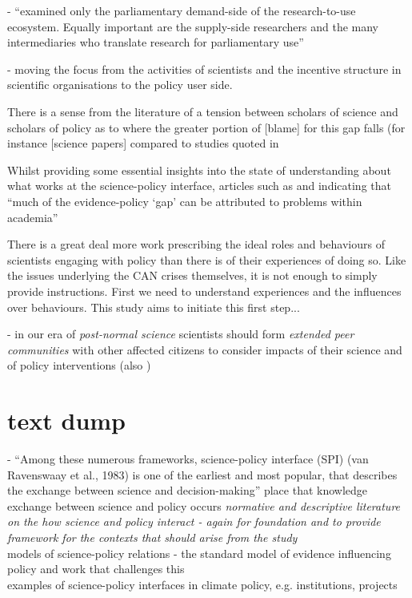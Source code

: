 \cite{KennyRHTB2017} - ``examined only the parliamentary demand-side of the research-to-use ecosystem. Equally important are the supply-side researchers and the many intermediaries who translate research for parliamentary use''

\cite{EdlerKB2022} - moving the focus from the activities of scientists and the incentive structure in scientific organisations to the policy user side.

There is a sense from the literature of a tension between scholars of science and scholars of policy as to where the greater portion of [blame] for this gap falls (for instance [science papers] compared to studies quoted in 

Whilst providing some essential insights into the state of understanding about what works at the science-policy interface, articles such as \textcite{OliverHBGC2022} and \textcite{Oliver202X} indicating that ``much of the evidence-policy `gap' can be attributed to problems within academia''


There is a great deal more work prescribing the ideal roles and behaviours of scientists engaging with policy than there is of their experiences of doing so. Like the issues underlying the CAN crises themselves, it is not enough to simply provide instructions. First we need to understand experiences and the influences over behaviours. This study aims to initiate this first step...


\cite{FuntowiczR1993,Jasanoff2003} - in our era of \emph{post-normal science} scientists should form \emph{extended peer communities} with other affected citizens to consider impacts of their science and of policy interventions (also \cite{KalafatisL2019})
\section{text dump}

\cite{JagannathanEtAl2023} - ``Among these numerous frameworks, science-policy interface (SPI) (van Ravenswaay et al., 1983) is one of the earliest and most popular, that describes the exchange between science and decision-making''
place that knowledge exchange between science and policy occurs
\emph{normative and descriptive literature on the how science and policy interact - again for foundation and to provide framework for the contexts that should arise from the study}\\
models of science-policy relations - the standard model of evidence influencing policy and work that challenges this\\
examples of science-policy interfaces in climate policy, e.g. institutions, projects

